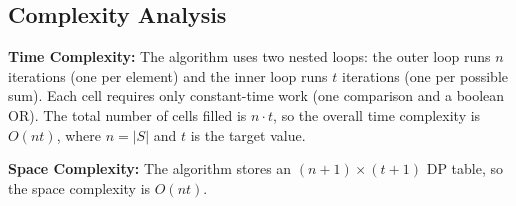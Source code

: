 \documentclass[12pt,a4paper]{article}
\begin{document}
\subsection*{Complexity Analysis}

\textbf{Time Complexity:} The algorithm uses two nested loops: the outer loop runs $n$ iterations (one per element) and the inner loop runs $t$ iterations (one per possible sum). Each cell requires only constant-time work (one comparison and a boolean OR). The total number of cells filled is $n \cdot t$, so the overall time complexity is $O(nt)$, where $n = |S|$ and $t$ is the target value.

\textbf{Space Complexity:} The algorithm stores an $(n+1) \times (t+1)$ DP table, so the space complexity is $O(nt)$.
\end{document}
